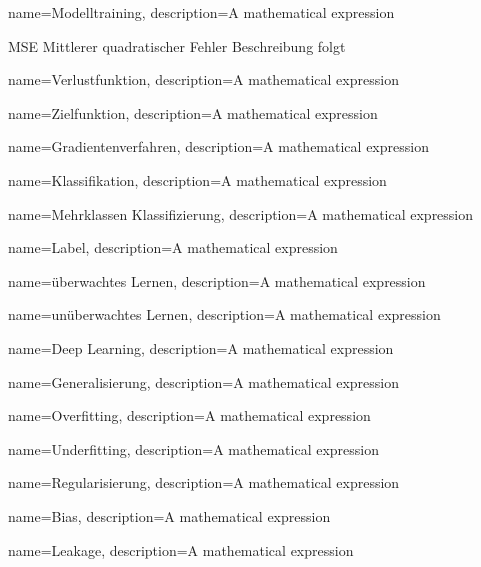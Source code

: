 {
        name=Modelltraining,
        description={A mathematical expression}
}

\newglossaryentrywithacronym
{MSE}
{Mittlerer quadratischer Fehler}
{Beschreibung folgt}

{
        name=Verlustfunktion,
        description={A mathematical expression}
}

{
        name=Zielfunktion,
        description={A mathematical expression}
}

{
        name=Gradientenverfahren,
        description={A mathematical expression}
}

{
        name=Klassifikation,
        description={A mathematical expression}
}

{
        name=Mehrklassen Klassifizierung,
        description={A mathematical expression}
}

{
        name=Label,
        description={A mathematical expression}
}

{
        name=überwachtes Lernen,
        description={A mathematical expression}
}

{
        name=unüberwachtes Lernen,
        description={A mathematical expression}
}

{
        name=Deep Learning,
        description={A mathematical expression}
}

{
        name=Generalisierung,
        description={A mathematical expression}
}

{
        name=Overfitting,
        description={A mathematical expression}
}

{
        name=Underfitting,
        description={A mathematical expression}
}

{
        name=Regularisierung,
        description={A mathematical expression}
}

{
        name=Bias,
        description={A mathematical expression}
}

{
        name=Leakage,
        description={A mathematical expression}
}

